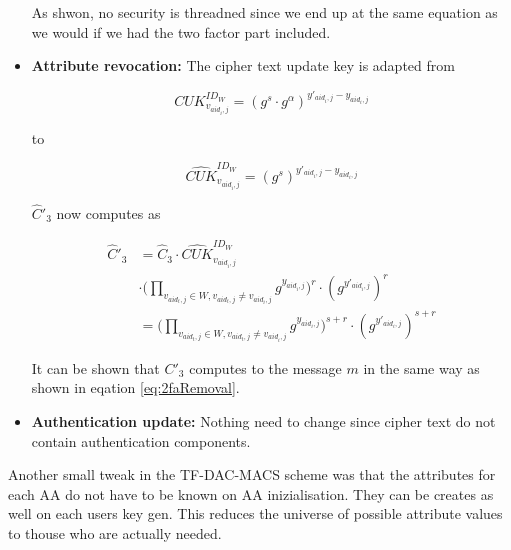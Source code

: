 \begin{itemize}
As shwon, no security is threadned since we end up at the same equation as we would if we had the two factor part included. 

\item \textbf{Attribute revocation:}
The cipher text update key is adapted from

$$
CUK^{ID_W}_{v_{aid_i,j}} = (g^s \cdotp g^\alpha)^{y'_{aid_i,j} - y_{aid_i,j}}
$$

to 

$$
\widehat{CUK}^{ID_W}_{v_{aid_i,j}} = (g^s)^{y'_{aid_i,j} - y_{aid_i,j}}
$$

$\widehat{C}'_3$ now computes as 

\begin{equation}
\begin{split}
\widehat{C}'_3 &= \widehat{C}_3 \cdotp \widehat{CUK}^{ID_W}_{v_{aid_i,j}} \\
&\cdotp \Big( \prod_{v_{aid_{t}, j}\in W, v_{aid_t, j} \neq v_{aid_i,j}} g^{y_{aid_{i}, j}} \Big)^{r} \cdotp (g^{y'_{aid_i,j}})^{r} \\
&= \Big( \prod_{v_{aid_{t}, j}\in W, v_{aid_t, j} \neq v_{aid_i,j}} g^{y_{aid_{i}, j}} \Big)^{s + r} \cdotp (g^{y'_{aid_i,j}})^{s + r}
\end{split}
\end{equation}

It can be shown that $C'_3$ computes to the message $m$ in the same way as shown in eqation \ref{eq:2faRemoval}.

\item \textbf{Authentication update:}
Nothing need to change since cipher text do not contain authentication components. 
\end{itemize}

Another small tweak in the \ac{TF-DAC-MACS} scheme was that the attributes for each \ac{AA} do not have to be known on AA inizialisation. They can be creates as well on each users key gen. This reduces the universe of possible attribute values to thouse who are actually needed.